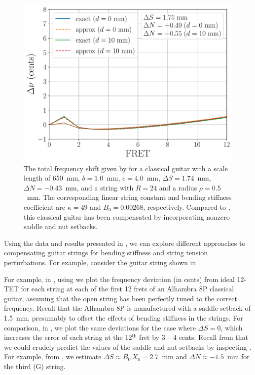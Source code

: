   \begin{figure}
    \centering
    \includegraphics[width=5.0in]{../figures/comp_est}
    \caption{\label{fig:comp_est} The total frequency shift given by  for a classical guitar with a scale length of 650~mm, $b = 1.0$~mm, $c = 4.0$~mm, $\Delta S = 1.74$~mm, $\Delta N = -0.43$~mm, and a string with $R = 24$ and a radius $\rho = 0.5$~mm. The corresponding linear string constant and bending stiffness coefficient are $\kappa = 49$ and $B_0 = 0.00268$, respectively. Compared to , this classical guitar has been compensated by incorporating nonzero saddle and nut setbacks.}
  \end{figure}
  


Using the data and results presented in , we can explore different approaches to compensating guitar strings for bending stiffness and string tension perturbations. For example, consider the guitar string shown in 


For example, in , using  we plot the frequency deviation (in cents) from ideal 12-TET for each string at each of the first 12 frets of an Alhambra 8P classical guitar, assuming that the open string has been perfectly tuned to the correct frequency. Recall that the Alhambra 8P is manufactured with a saddle setback of 1.5~mm, presumably to offset the effects of bending stiffness in the strings. For comparison, in , we plot the same deviations for the case where $\Delta S = 0$, which increases the error of each string at the 12$^\text{th}$ fret by 3 -- 4 cents. Recall from  that we could crudely predict the values of the saddle and nut setbacks by inspecting . For example, from , we estimate $\Delta S \approx B_0\, X_0 = 2.7$~mm and $\Delta N \approx -1.5$~mm for the third (G) string.

